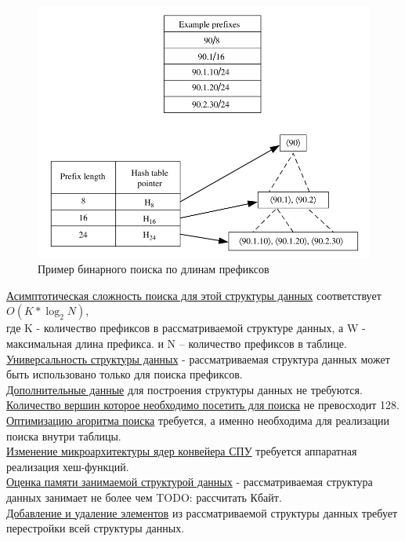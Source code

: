 \documentclass[a4peper, 12pt, titlepage, finall]{report}
\begin{document}
            \begin{figure}[h]
                \includegraphics[width=\textwidth]{binary_search.png}
                \caption{Пример бинарного поиска по длинам префиксов}
                \label{fig:mesh4}
            \end{figure}


            \underline{Асимптотическая сложность поиска для этой структуры данных} соответствует {\ttfamily $O(K*\log_2{N})$},\\
            где {\ttfamily K} - количество префиксов в рассматриваемой структуре данных, а {\ttfamily W} - максимальная длина префикса.
            и {\ttfamily N} -- количество префиксов в таблице.\\
            \underline{Универсальность структуры данных} - рассматриваемая структура данных может быть использовано только для поиска префиксов.\\
            \underline{Дополнительные данные} для построения структуры данных не требуются.\\
            \underline{Количество вершин которое необходимо посетить для поиска} не превосходит 128.\\
            \underline{Оптимизацию агоритма поиска} требуется, а именно необходима для реализации поиска внутри таблицы.\\
            \underline{Изменение микроархитектуры ядер конвейера СПУ} требуется аппаратная реализация хеш-функций.\\
            \underline{Оценка памяти занимаемой структурой данных} - рассматриваемая структура данных занимает не более чем {\ttfamily TODO: рассчитать} Кбайт.\\
            \underline{Добавление и удаление элементов} из рассматриваемой структуры данных требует перестройки всей структуры данных.\\
\end{document}
